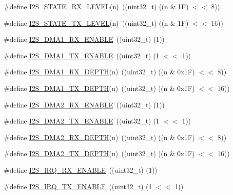 \begin{DoxyCompactItemize}
\#define \hyperlink{group___i2_s__18_x_x__43_x_x_gab51548f7e41cb523a77beb7c88c5d33a}{I2\+S\+\_\+\+S\+T\+A\+T\+E\+\_\+\+R\+X\+\_\+\+L\+E\+V\+EL}(n)~((uint32\+\_\+t) ((n \& 1\+F) $<$$<$ 8))
\item 
\#define \hyperlink{group___i2_s__18_x_x__43_x_x_ga2421a91f0ddda94150de2f80c4192039}{I2\+S\+\_\+\+S\+T\+A\+T\+E\+\_\+\+T\+X\+\_\+\+L\+E\+V\+EL}(n)~((uint32\+\_\+t) ((n \& 1\+F) $<$$<$ 16))
\item 
\#define \hyperlink{group___i2_s__18_x_x__43_x_x_ga7b643833c4b80116d3026c7933449001}{I2\+S\+\_\+\+D\+M\+A1\+\_\+\+R\+X\+\_\+\+E\+N\+A\+B\+LE}~((uint32\+\_\+t) (1))
\item 
\#define \hyperlink{group___i2_s__18_x_x__43_x_x_ga0fb809d583bb8b68d34f347d19933575}{I2\+S\+\_\+\+D\+M\+A1\+\_\+\+T\+X\+\_\+\+E\+N\+A\+B\+LE}~((uint32\+\_\+t) (1 $<$$<$ 1))
\item 
\#define \hyperlink{group___i2_s__18_x_x__43_x_x_gaee0ebb1d1bc7444e2201d4473c41f182}{I2\+S\+\_\+\+D\+M\+A1\+\_\+\+R\+X\+\_\+\+D\+E\+P\+TH}(n)~((uint32\+\_\+t) ((n \& 0x1\+F) $<$$<$ 8))
\item 
\#define \hyperlink{group___i2_s__18_x_x__43_x_x_ga4eedce5a4fc3c03413a4d7cfdd0f60de}{I2\+S\+\_\+\+D\+M\+A1\+\_\+\+T\+X\+\_\+\+D\+E\+P\+TH}(n)~((uint32\+\_\+t) ((n \& 0x1\+F) $<$$<$ 16))
\item 
\#define \hyperlink{group___i2_s__18_x_x__43_x_x_ga2e4e8b4d132b01bb74d57dd34ca7eaef}{I2\+S\+\_\+\+D\+M\+A2\+\_\+\+R\+X\+\_\+\+E\+N\+A\+B\+LE}~((uint32\+\_\+t) (1))
\item 
\#define \hyperlink{group___i2_s__18_x_x__43_x_x_ga2ceda1798034a70380c9a9de567bb6b0}{I2\+S\+\_\+\+D\+M\+A2\+\_\+\+T\+X\+\_\+\+E\+N\+A\+B\+LE}~((uint32\+\_\+t) (1 $<$$<$ 1))
\item 
\#define \hyperlink{group___i2_s__18_x_x__43_x_x_gaa988d9e73e80df6ce687e148ee9530ae}{I2\+S\+\_\+\+D\+M\+A2\+\_\+\+R\+X\+\_\+\+D\+E\+P\+TH}(n)~((uint32\+\_\+t) ((n \& 0x1\+F) $<$$<$ 8))
\item 
\#define \hyperlink{group___i2_s__18_x_x__43_x_x_gaff02275ceaf3866c99b464b11ed0a270}{I2\+S\+\_\+\+D\+M\+A2\+\_\+\+T\+X\+\_\+\+D\+E\+P\+TH}(n)~((uint32\+\_\+t) ((n \& 0x1\+F) $<$$<$ 16))
\item 
\#define \hyperlink{group___i2_s__18_x_x__43_x_x_ga362154dbf216f1384f535c940d930cd9}{I2\+S\+\_\+\+I\+R\+Q\+\_\+\+R\+X\+\_\+\+E\+N\+A\+B\+LE}~((uint32\+\_\+t) (1))
\item 
\#define \hyperlink{group___i2_s__18_x_x__43_x_x_ga7811db5a292d68de3dce209883bab6c0}{I2\+S\+\_\+\+I\+R\+Q\+\_\+\+T\+X\+\_\+\+E\+N\+A\+B\+LE}~((uint32\+\_\+t) (1 $<$$<$ 1))
$$
\end{DoxyCompactItemize}
